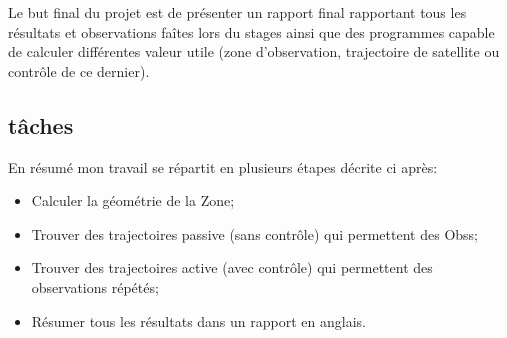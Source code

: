 \documentclass[12pt]{article} %
\begin{document}
		
		Le but final du projet est de présenter un rapport final rapportant tous les résultats et observations faîtes lors du stages ainsi que des programmes capable de calculer différentes valeur utile (zone d'observation, trajectoire de satellite ou contrôle de ce dernier).
		
		\subsection{tâches}
		En résumé mon travail se répartit en plusieurs étapes décrite ci après:
		\begin{itemize}
			\item Calculer la géométrie de la \gls{Zone};
			\item Trouver des trajectoires passive (sans contrôle) qui permettent des \glspl{Obs};
			\item Trouver des trajectoires active (avec contrôle) qui permettent des observations répétés;
			\item Résumer tous les résultats dans un rapport en anglais.
		\end{itemize}
		
\end{document}
